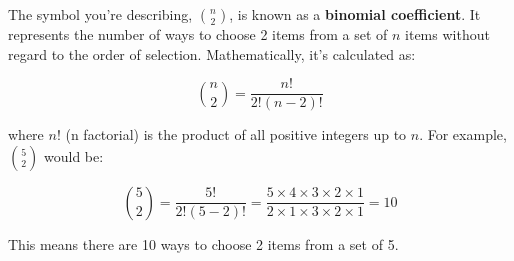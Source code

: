 \documentclass{article}
\begin{document}
The symbol you're describing, \( \binom{n}{2} \), is known as a \textbf{binomial coefficient}. It represents the number of ways to choose 2 items from a set of \( n \) items without regard to the order of selection. Mathematically, it's calculated as:

\[
\binom{n}{2} = \frac{n!}{2!(n-2)!}
\]

where \( n! \) (n factorial) is the product of all positive integers up to \( n \). For example, \( \binom{5}{2} \) would be:

\[
\binom{5}{2} = \frac{5!}{2!(5-2)!} = \frac{5 \times 4 \times 3 \times 2 \times 1}{2 \times 1 \times 3 \times 2 \times 1} = 10
\]

This means there are 10 ways to choose 2 items from a set of 5.
\end{document}
